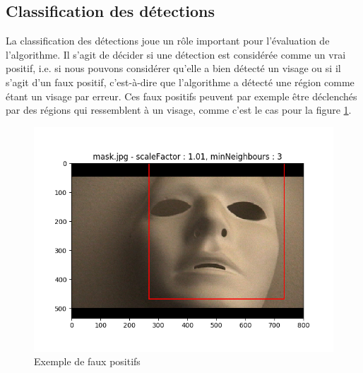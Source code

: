 \documentclass[a4paper,11pt]{article}
\begin{document}
    \subsection{Classification des détections}
        
        La classification des détections joue un rôle important pour l'évaluation de l'algorithme.
        Il s'agit de décider si une détection est considérée comme un vrai positif, i.e. si nous pouvons considérer qu'elle a bien détecté un visage ou si il s'agit d'un faux positif, c'est-à-dire que l'algorithme a détecté une région comme étant un visage par erreur. Ces faux positifs peuvent par exemple être déclenchés par des régions qui ressemblent à un visage, comme c'est le cas pour la figure \ref{fig:mask_faux_positif}.
	    \begin{figure}[H]
	        \begin{center}
	    	\includegraphics[scale = 0.6]{images/mask_1,01_3.png}
	    	\caption{Exemple de faux positifs}
	    	\label{fig:mask_faux_positif}
	        \end{center}
	    \end{figure}
\end{document}
